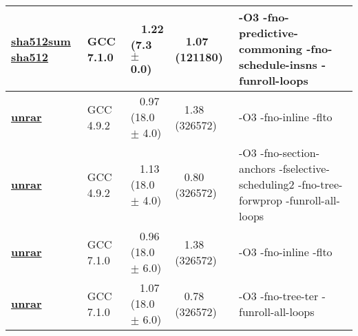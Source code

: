 \begin{tabular}{|l|l|p{1.2in}|p{0.9in}|p{1.8in}|}
     \hline
      \textbf{ \href{http://cknowledge.org/repo/web.php?wcid=experiment:20995294bf184644\&subpoint=fa8f9e4af29f3a8c}{sha512sum sha512} } &  GCC 7.1.0  &  ~ 1.22 (7.3 $\pm$ 0.0)  &  ~ 1.07 (121180)  & {\small -O3 -fno-predictive-commoning -fno-schedule-insns -funroll-loops }\\
     \hline
      \textbf{ \href{http://cknowledge.org/repo/web.php?wcid=experiment:1a89c378d17ce4d0\&subpoint=981b7b9de6f50286}{unrar} } &  GCC 4.9.2  &  ~ 0.97 (18.0 $\pm$ 4.0)  &  ~ 1.38 (326572)  & {\small -O3 -fno-inline -flto }\\
     \hline
      \textbf{ \href{http://cknowledge.org/repo/web.php?wcid=experiment:1a89c378d17ce4d0\&subpoint=94451a72a5aadda2}{unrar} } &  GCC 4.9.2  &  ~ 1.13 (18.0 $\pm$ 4.0)  &  ~ 0.80 (326572)  & {\small -O3 -fno-section-anchors -fselective-scheduling2 -fno-tree-forwprop -funroll-all-loops }\\
     \hline
      \textbf{ \href{http://cknowledge.org/repo/web.php?wcid=experiment:cbeb48dd9eaec742\&subpoint=82db107f34066a74}{unrar} } &  GCC 7.1.0  &  ~ 0.96 (18.0 $\pm$ 6.0)  &  ~ 1.38 (326572)  & {\small -O3 -fno-inline -flto }\\
     \hline
      \textbf{ \href{http://cknowledge.org/repo/web.php?wcid=experiment:cbeb48dd9eaec742\&subpoint=8a5a431da242467a}{unrar} } &  GCC 7.1.0  &  ~ 1.07 (18.0 $\pm$ 6.0)  &  ~ 0.78 (326572)  & {\small -O3 -fno-tree-ter -funroll-all-loops }\\
     \hline
    \end{tabular}    